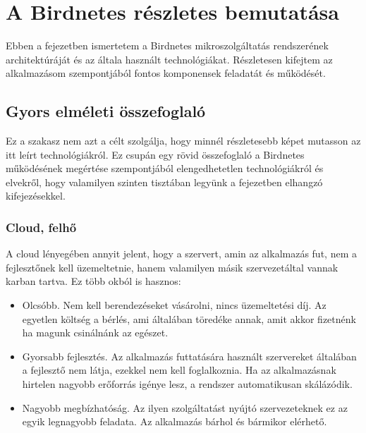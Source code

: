 \chapter{A Birdnetes részletes bemutatása}
\label{chapt:birdnetes-introduction}
Ebben a fejezetben ismertetem a Birdnetes mikroszolgáltatás rendszerének architektúráját és az általa használt technológiákat.
Részletesen kifejtem az alkalmazásom szempontjából fontos komponensek feladatát és működését.

\section{Gyors elméleti összefoglaló}
Ez a szakasz nem azt a célt szolgálja, hogy minnél részletesebb képet mutasson az itt leírt technológiákról.
Ez csupán egy rövid összefoglaló a Birdnetes működésének megértése szempontjából elengedhetetlen technológiákról és elvekről,
hogy valamilyen szinten tisztában legyünk a fejezetben elhangzó kifejezésekkel.

\subsection{Cloud, felhő}
A cloud lényegében annyit jelent, hogy a szervert, amin az alkalmazás fut, nem a fejlesztőnek kell üzemeltetnie,
hanem valamilyen másik szervezet\footnotemark által vannak karban tartva. 
Ez több okból is hasznos:
\begin{itemize}
    \item Olcsóbb. Nem kell berendezéseket vásárolni, nincs üzemeltetési díj. Az egyetlen költség a bérlés, ami általában töredéke annak, amit akkor fizetnénk ha magunk csinálnánk az egészet.
    \item Gyorsabb fejlesztés. Az alkalmazás futtatására használt szervereket általában a fejlesztő nem látja, ezekkel nem kell foglalkoznia. Ha az alkalmazásnak hirtelen nagyobb erőforrás igénye lesz, a rendszer automatikusan skálázódik.
    \item Nagyobb megbízhatóság. Az ilyen szolgáltatást nyújtó szervezeteknek ez az egyik legnagyobb feladata. Az alkalmazás bárhol és bármikor elérhető.
\end{itemize}

